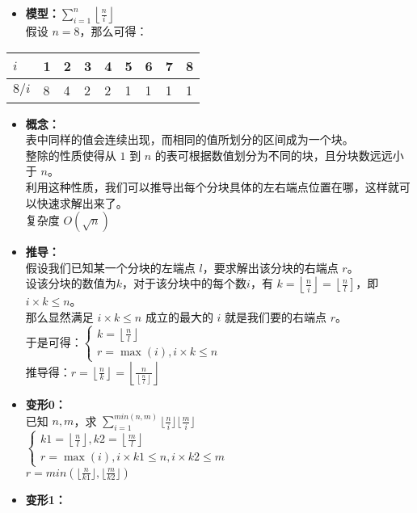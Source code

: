 \documentclass[E:/GsjzTle/main/main.tex]{subfiles}
\begin{document}
\begin{itemize}
\item
  \textbf{模型：}\(\sum_{i=1}^{n}\left\lfloor\frac{n}{i}\right\rfloor\)\\
  假设 \(n = 8\)，那么可得：
\end{itemize}

\begin{longtable}[]{@{}lllllllll@{}}
\toprule
\(i\) & 1 & 2 & 3 & 4 & 5 & 6 & 7 & 8 \\
\midrule
\endhead
\(8/i\) & 8 & 4 & 2 & 2 & 1 & 1 & 1 & 1 \\
\bottomrule
\end{longtable}

\begin{itemize}
\item
  \textbf{概念：}\\
  表中同样的值会连续出现，而相同的值所划分的区间成为一个块。\\
  整除的性质使得从 \(1\) 到 \(n\)
  的表可根据数值划分为不同的块，且分块数远远小于 \(n\)。\\
  利用这种性质，我们可以推导出每个分块具体的左右端点位置在哪，这样就可以快速求解出来了。\\
  复杂度 \(O(\sqrt{n})\)
\item
  \textbf{推导：}\\
  假设我们已知某一个分块的左端点 \(l\)，要求解出该分块的右端点 \(r\)。\\
  设该分块的数值为\(k\)，对于该分块中的每个数\(i\)，有
  \(k=\left\lfloor\frac{n}{i}\right\rfloor=\left\lfloor\frac{n}{l}\right]\)，即
  \(i\times k \le n\)。\\
  那么显然满足 \(i \times k \le n\) 成立的最大的 \(i\)
  就是我们要的右端点 \(r\)。\\
  于是可得：\(\left\{\begin{array}{l}k=\left\lfloor\frac{n}{l}\right\rfloor \\ r=\max (i), i \times k \leq n\end{array}\right.\)\\
  推导得：\(r=\left\lfloor\frac{n}{k}\right\rfloor=\left\lfloor \frac{n}{\left\lfloor\frac{n}{l}\right\rfloor}\right\rfloor\)
\item
  \textbf{变形0：}\\
  已知 \(n,m\)，求
  \(\sum_{i=1}^{min(n,m)}\lfloor\frac{n}{ i}\rfloor\lfloor\frac{m}{i}\rfloor\)\\
  \(\left\{\begin{array}{l}k1=\left\lfloor\frac{n}{l}\right\rfloor,k2= \left\lfloor\frac{m}{l}\right\rfloor\\ r=\max (i), i \times k1 \leq n,i\times k2 \le m\end{array}\right.\)\\
  \(r = min(\lfloor\frac{n}{k1}\rfloor,\lfloor\frac{m}{k2}\rfloor)\)
\item
  \textbf{变形1：}


\end{itemize}
\end{document}

